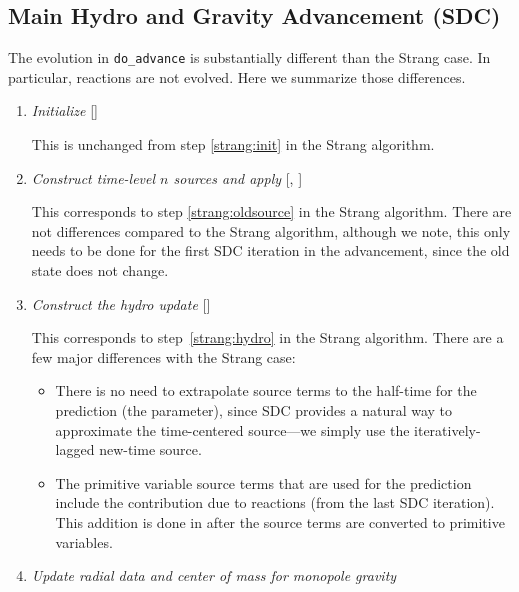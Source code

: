 \subsection{Main Hydro and Gravity Advancement (SDC)}

The evolution in {\tt do\_advance} is substantially different than the
Strang case.  In particular, reactions are not evolved.  Here we
summarize those differences.

\begin{enumerate}
\item {\em Initialize} []

This is unchanged from step \ref{strang:init} in the Strang algorithm.


\item {\em Construct time-level $n$ sources and apply} 
  [, ]

This corresponds to step \ref{strang:oldsource} in the Strang
algorithm.  There are not differences compared to the Strang
algorithm, although we note, this only needs to be done for the first
SDC iteration in the advancement, since the old state does not change.

\item {\em Construct the hydro update} []

This corresponds to step~\ref{strang:hydro} in the Strang
algorithm.  There are a few major differences with the Strang case:
\begin{itemize}
\item There is no need to extrapolate source terms to the half-time
  for the prediction (the 
  parameter), since SDC provides a natural way to approximate the
  time-centered source---we simply use the iteratively-lagged new-time
  source.

\item The primitive variable source terms that are used for the
  prediction include the contribution due to reactions (from the last
  SDC iteration).  This addition is done in
   after the source terms are
  converted to primitive variables.
\end{itemize}

\item {\em Update radial data and center of mass for monopole gravity}
  

\end{enumerate}
